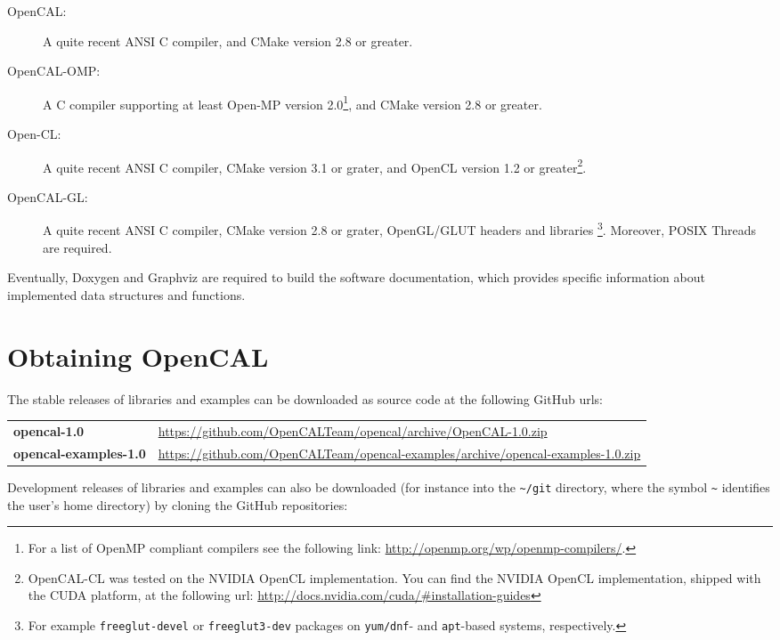 \begin{description}
\item[OpenCAL: ] A quite recent ANSI C compiler, and CMake version 2.8
  or greater.
\item[OpenCAL-OMP: ] A C compiler supporting at least Open-MP version
  2.0\footnote{For a list of OpenMP compliant compilers see the
    following link: \url{http://openmp.org/wp/openmp-compilers/}.},
  and CMake version 2.8 or greater.
\item[Open-CL: ] A quite recent ANSI C compiler, CMake version 3.1 or
  grater, and OpenCL version 1.2 or greater\footnote{OpenCAL-CL was
    tested on the NVIDIA OpenCL implementation. You can find the
    NVIDIA OpenCL implementation, shipped with the CUDA platform, at
    the following url:
    \url{http://docs.nvidia.com/cuda/\#installation-guides}}.
\item[OpenCAL-GL: ] A quite recent ANSI C compiler, CMake version 2.8
  or grater, OpenGL/GLUT headers and libraries \footnote{For
  example \texttt{freeglut-devel} or \texttt{freeglut3-dev} packages
  on \texttt{yum/dnf}- and \texttt{apt}-based systems,
  respectively.}. Moreover, POSIX Threads are required.
\end{description}

\noindent Eventually, Doxygen and Graphviz are required to build the
software documentation, which provides specific information about
implemented data structures and functions.

\section{Obtaining OpenCAL}

The stable releases of libraries and examples can be downloaded as source code at the
following GitHub urls:

\begin{table}[h]
  \centering
  \begin{tabularx}{\textwidth}{lX}
    \textbf{opencal-1.0} & \url{https://github.com/OpenCALTeam/opencal/archive/OpenCAL-1.0.zip}\\
    \textbf{opencal-examples-1.0} & \url{https://github.com/OpenCALTeam/opencal-examples/archive/opencal-examples-1.0.zip}\\
  \end{tabularx}
\end{table}

\noindent Development releases of libraries and examples can also be
downloaded (for instance into the \verb'~/git' directory, where the
symbol \verb'~' identifies the user's home directory) by cloning the
GitHub repositories:

